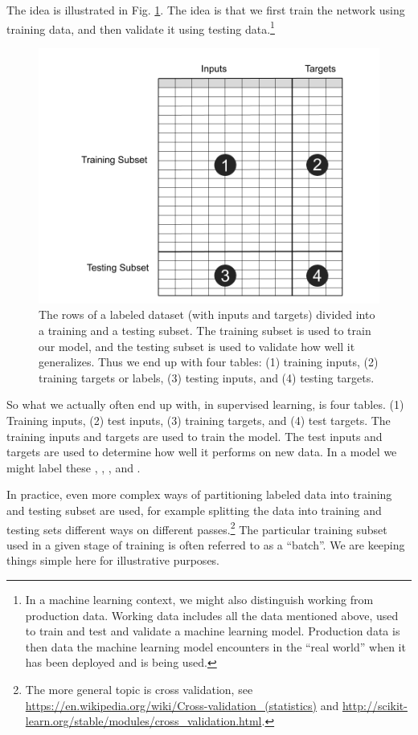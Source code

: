 The idea is illustrated in Fig. \ref{trainTest}. The idea is that we first train the network using training data, and then validate it using testing data.\footnote{In a machine learning context, we might also distinguish working from production data. Working data includes all the data mentioned above, used to train and test and validate a machine learning model. Production data is then data the machine learning model encounters in the ``real world'' when it has been deployed and is being used.} 

\begin{figure}[h]
\centering
\includegraphics[scale=0.3]{./images/trainTest2.png}
\caption[Jeff Yoshimi.]{The rows of a labeled dataset (with inputs and targets) divided into a training and a  testing subset. The training subset is used to train our model, and the testing subset is used to validate how well it generalizes. Thus we end up with four tables: (1) training inputs, (2)  training targets or labels, (3) testing inputs, and (4) testing targets. }
\label{trainTest}
\end{figure}

So what we actually often end up with, in supervised learning, is four tables. (1) Training inputs, (2) test inputs, (3) training targets, and (4) test targets. The training inputs and targets are used to train the model. The test inputs and targets are used to determine how well it performs on new data. In a model we might label these , , , and . 

In practice, even more complex ways of partitioning labeled data into training and testing subset are used, for example splitting the data into training and testing sets different ways on different passes.\footnote{The more general topic is cross validation, see \url{https://en.wikipedia.org/wiki/Cross-validation_(statistics)} and \url{http://scikit-learn.org/stable/modules/cross_validation.html}.} The particular training subset used in a given stage of training is often referred to as a ``batch''. We are keeping things simple here for illustrative purposes.
 
